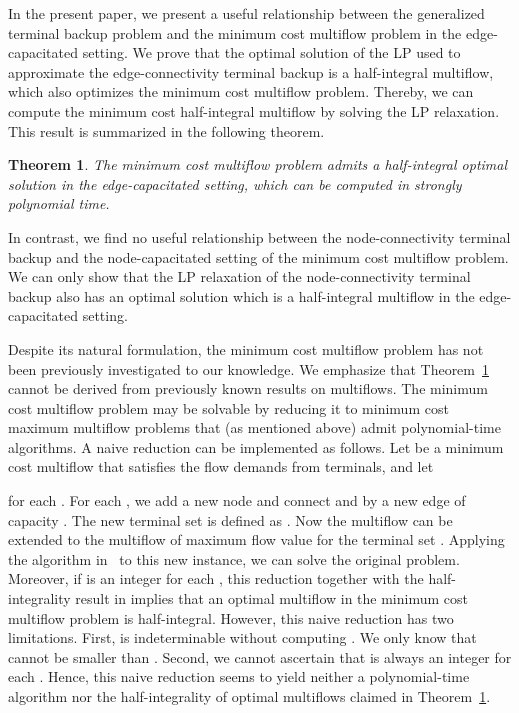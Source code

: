 \documentclass{article}
\newtheorem{theorem}{Theorem}
\begin{document}
In the present paper, we present a useful relationship 
between the generalized terminal backup problem
and
the minimum cost multiflow problem in the edge-capacitated setting.
We prove that the optimal solution of the LP
used to approximate the edge-connectivity terminal backup is a half-integral multiflow,
which also optimizes the minimum cost multiflow problem.
Thereby, we can compute the minimum cost half-integral multiflow by
solving the LP relaxation. This result is summarized in the following theorem.

\begin{theorem} \label{thm:flow}
The minimum cost multiflow problem admits a half-integral optimal solution in the edge-capacitated 
setting, which can be computed in strongly polynomial time.
\end{theorem}

In contrast, we find no useful relationship between the node-connectivity terminal backup
and the node-capacitated setting of the minimum cost multiflow problem.
We can only show that the LP relaxation of the node-connectivity terminal backup also
has an optimal solution which is a half-integral multiflow in the edge-capacitated setting.


Despite its natural formulation,
the minimum cost multiflow problem has not been previously investigated to our knowledge.
We emphasize that Theorem~\ref{thm:flow} cannot be derived from previously known results on multiflows.
The minimum cost multiflow problem
may be solvable 
by reducing it to minimum cost maximum multiflow problems that (as mentioned above)
admit polynomial-time algorithms.
A naive reduction can be implemented as follows.
Let  be a minimum cost multiflow that satisfies the flow demands from terminals, and let

for each . 
For each ,
we add a new node  and connect  and  by a new edge of capacity .
The new terminal set  is defined as .
Now the multiflow  can be extended to the multiflow of maximum flow value for the terminal
set . Applying
the algorithm in~\cite{Karzanov94} to this new instance,
we can solve the original problem.
Moreover, if  is an integer for each ,
this reduction together with the half-integrality result in \cite{Karzanov79,Karzanov94} implies that 
an optimal multiflow in the minimum cost multiflow problem is half-integral.
However, this naive reduction has two limitations. First,  is indeterminable
without computing . We only know that  cannot be smaller than .
Second, we cannot ascertain that  is always an integer for each .
Hence, this naive reduction
seems to yield neither a polynomial-time algorithm nor the half-integrality of optimal
multiflows claimed in Theorem~\ref{thm:flow}.
\end{document}
